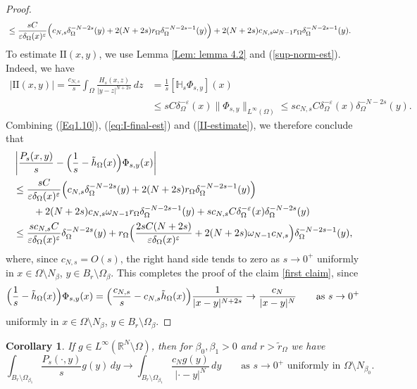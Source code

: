 \documentclass[notitlepage,11pt,reqno]{amsart}
\newtheorem{corollary}[theorem]{Corollary}
\theoremstyle{definition}
\numberwithin{equation}{section}
\newcommand{\R}{\mathds{R}}
\begin{document}
\begin{proof}
\begin{align}
    &\leq \frac{sC}{\varepsilon \delta_{\Omega}(x)^{\varepsilon}}
\Bigl(c_{N,s}\delta_\Omega^{-N-2s}(y)+  2(N+2s)r_{\Omega}\delta_\Omega^{-N-2s-1}(y)\Bigr)+ 2 (N+2s)c_{N,s} \omega_{N-1} r_\Omega \delta_\Omega^{-N-2s-1}(y). \nonumber
  \end{align}
\vspace{.5cm}
 To estimate $\mathrm{II}(x,y)$, we use Lemma \ref{Lem: lemma 4.2} and (\ref{sup-norm-est}). Indeed, we have
\begin{align}
  |\mathrm{II}(x,y)| =  \frac{c_{N, s}}{s}\int_{\Omega} \frac{H_s(x, z)}{|y-z|^{N+2s}}\,dz&= \frac{1}{s}\left[\mathbb{H}_s \Phi_{s, y}\right](x) \nonumber\\
  &\leq sC\delta^{-\varepsilon}_{\Omega}(x)\|\Phi_{s, y}\|_{L^{\infty}(\Omega)} \le sc_{N,s} C\delta^{-\varepsilon}_{\Omega}(x) \delta^{-N-2s}_\Omega(y).  \label{II-estimate}
\end{align}
Combining (\ref{Eq1.10}), (\ref{eq:I-final-est}) and (\ref{II-estimate}), we therefore conclude that 
\begin{align}
  \label{difference-estimate}
&\left|\frac{P_s(x, y)}{s} - \Bigl(\frac{1}{s} - \tilde h_\Omega(x)\Bigr)\Phi_{s,y}(x) \right|\nonumber\\
    &\leq \frac{sC}{\varepsilon \delta_{\Omega}(x)^{\varepsilon}}
      \Bigl(c_{N,s}\delta_\Omega^{-N-2s}(y)+  2(N+2s)r_{\Omega}\delta_\Omega^{-N-2s-1}(y)\Bigr)\nonumber\\
  &\qquad + 2 (N+2s)c_{N,s}\omega_{N-1} r_\Omega \delta_\Omega^{-N-2s-1}(y) + sc_{N,s} C\delta^{-\varepsilon}_{\Omega}(x) \delta^{-N-2s}_\Omega(y)\nonumber\\
    &\leq  \frac{s c_{N,s}C}{\varepsilon \delta_{\Omega}(x)^{\varepsilon}} \delta^{-N-2s}_\Omega(y) + 
r_{\Omega} \Bigl(\frac{2 sC (N+2s)}{\varepsilon \delta_{\Omega}(x)^{\varepsilon}}+ 2(N+2s) \omega_{N-1} c_{N,s} \Bigr)\delta_\Omega^{-N-2s-1}(y),
\end{align}
where,  since $c_{N,s}=O(s)$, the right hand side tends to zero as $s \to 0^+$ uniformly in $x \in \Omega \setminus N_\beta$, $y \in B_r \setminus \Omega_{\beta}$.  This completes the proof of the claim \eqref{first claim}, since
$$
\Bigl(\frac{1}{s} - \tilde h_\Omega(x)\Bigr)\Phi_{s,y}(x)= \Bigl(\frac{c_{N,s}}{s} - c_{N,s}\tilde h_\Omega(x)\Bigr)\frac{1}{|x-y|^{N+2s}} \to \frac{c_N}{|x-y|^{N}} \qquad \text{as $s \to 0^+$}
$$
uniformly in $x \in \Omega \setminus N_\beta$, $y \in B_r \setminus \Omega_{\beta}$.
\end{proof}
\begin{corollary}
\label{beta-1-beta-2-r-cor}
If $g \in L^\infty(\R^N \setminus \Omega)$, then for $\beta_0,\beta_1>0$ and $r > \tilde r_\Omega$ we have 
\begin{equation*}
\int_{B_r \setminus \Omega_{\beta_1}}\frac{P_s(\cdot, y)}{s}g(y)\, dy \to
     \int_{B_r \setminus \Omega_{\beta_1}} \frac{c_Ng(y)}{|\cdot-y|^N}\,dy \qquad \text{as $s \to 0^+$ uniformly in $\Omega \setminus N_{\beta_0}$.}
\end{equation*}
\end{corollary}
\end{document}

